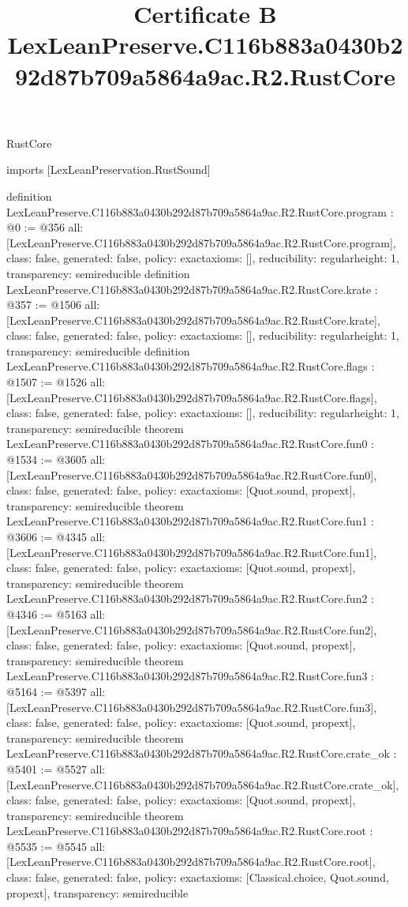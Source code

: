 \begin{lexlean}{RustCore}
\title{Certificate B LexLeanPreserve.C116b883a0430b292d87b709a5864a9ac.R2.RustCore}
\begin{coremodule}
imports [LexLeanPreservation.RustSound]

definition LexLeanPreserve.C116b883a0430b292d87b709a5864a9ac.R2.RustCore.program : @0 := @356 {
  all: [LexLeanPreserve.C116b883a0430b292d87b709a5864a9ac.R2.RustCore.program],
  class: false,
  generated: false,
  policy: exact{axioms: []},
  reducibility: regular{height: 1},
  transparency: semireducible
}
definition LexLeanPreserve.C116b883a0430b292d87b709a5864a9ac.R2.RustCore.krate : @357 := @1506 {
  all: [LexLeanPreserve.C116b883a0430b292d87b709a5864a9ac.R2.RustCore.krate],
  class: false,
  generated: false,
  policy: exact{axioms: []},
  reducibility: regular{height: 1},
  transparency: semireducible
}
definition LexLeanPreserve.C116b883a0430b292d87b709a5864a9ac.R2.RustCore.flags : @1507 := @1526 {
  all: [LexLeanPreserve.C116b883a0430b292d87b709a5864a9ac.R2.RustCore.flags],
  class: false,
  generated: false,
  policy: exact{axioms: []},
  reducibility: regular{height: 1},
  transparency: semireducible
}
theorem LexLeanPreserve.C116b883a0430b292d87b709a5864a9ac.R2.RustCore.fun0 : @1534 := @3605 {
  all: [LexLeanPreserve.C116b883a0430b292d87b709a5864a9ac.R2.RustCore.fun0],
  class: false,
  generated: false,
  policy: exact{axioms: [Quot.sound, propext]},
  transparency: semireducible
}
theorem LexLeanPreserve.C116b883a0430b292d87b709a5864a9ac.R2.RustCore.fun1 : @3606 := @4345 {
  all: [LexLeanPreserve.C116b883a0430b292d87b709a5864a9ac.R2.RustCore.fun1],
  class: false,
  generated: false,
  policy: exact{axioms: [Quot.sound, propext]},
  transparency: semireducible
}
theorem LexLeanPreserve.C116b883a0430b292d87b709a5864a9ac.R2.RustCore.fun2 : @4346 := @5163 {
  all: [LexLeanPreserve.C116b883a0430b292d87b709a5864a9ac.R2.RustCore.fun2],
  class: false,
  generated: false,
  policy: exact{axioms: [Quot.sound, propext]},
  transparency: semireducible
}
theorem LexLeanPreserve.C116b883a0430b292d87b709a5864a9ac.R2.RustCore.fun3 : @5164 := @5397 {
  all: [LexLeanPreserve.C116b883a0430b292d87b709a5864a9ac.R2.RustCore.fun3],
  class: false,
  generated: false,
  policy: exact{axioms: [Quot.sound, propext]},
  transparency: semireducible
}
theorem LexLeanPreserve.C116b883a0430b292d87b709a5864a9ac.R2.RustCore.crate_ok : @5401 := @5527 {
  all: [LexLeanPreserve.C116b883a0430b292d87b709a5864a9ac.R2.RustCore.crate_ok],
  class: false,
  generated: false,
  policy: exact{axioms: [Quot.sound, propext]},
  transparency: semireducible
}
theorem LexLeanPreserve.C116b883a0430b292d87b709a5864a9ac.R2.RustCore.root : @5535 := @5545 {
  all: [LexLeanPreserve.C116b883a0430b292d87b709a5864a9ac.R2.RustCore.root],
  class: false,
  generated: false,
  policy: exact{axioms: [Classical.choice, Quot.sound, propext]},
  transparency: semireducible
}


\end{coremodule}
\end{lexlean}
